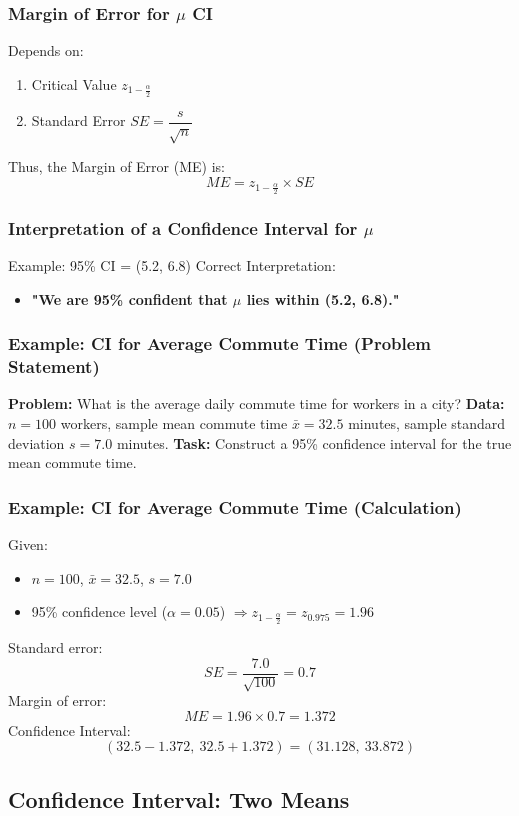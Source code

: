 \documentclass[handout]{beamer}
\begin{document}
\begin{frame}
\frametitle{Margin of Error for $\mu$ CI}
Depends on:
\begin{enumerate}
\item Critical Value $z_{1-\frac{\alpha}{2}}$
\item Standard Error $SE = \dfrac{s}{\sqrt{n}}$
\end{enumerate}
Thus, the Margin of Error (ME) is:
\[ ME = z_{1-\frac{\alpha}{2}} \times SE \]
\end{frame}

\begin{frame}
\frametitle{Interpretation of a Confidence Interval for $\mu$}
Example: 95\% CI = (5.2, 6.8)
Correct Interpretation:
\begin{itemize}
\item \textbf{"We are 95\% confident that $\mu$ lies within (5.2, 6.8)."}
\end{itemize}
\end{frame}

\begin{frame}
\frametitle{Example: CI for Average Commute Time (Problem Statement)}
\textbf{Problem:} What is the average daily commute time for workers in a city? \newline
\textbf{Data:} $n=100$ workers, sample mean commute time $\bar{x}=32.5$ minutes, sample standard deviation $s=7.0$ minutes. \newline
\textbf{Task:} Construct a 95\% confidence interval for the true mean commute time.
\end{frame}

\begin{frame}
\frametitle{Example: CI for Average Commute Time (Calculation)}
Given:
\begin{itemize}
\item $n = 100$, $\bar{x} = 32.5$, $s = 7.0$
\item 95\% confidence level ($\alpha=0.05$) $\Rightarrow z_{1-\frac{\alpha}{2}} = z_{0.975}= 1.96$
\end{itemize}
Standard error:
\[ SE = \frac{7.0}{\sqrt{100}} = 0.7 \]
Margin of error:
\[ ME = 1.96 \times 0.7 = 1.372 \]
Confidence Interval:
\[ (32.5 - 1.372,\ 32.5 + 1.372) = (31.128,\ 33.872) \]
\end{frame}

\subsection{Confidence Interval: Two Means}
\end{document}
